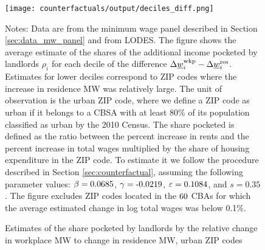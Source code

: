 \begin{figure}[h!]
    \centering
    \caption{Estimates of the share pocketed by landlords by the relative 
             change in workplace MW to change in residence MW, urban ZIP codes}
    \label{fig:rho_by_decile_MW_gap}

	\texttt{[image: counterfactuals/output/deciles\_diff.png]}

    \begin{minipage}{.95\textwidth} \footnotesize
        \vspace{3mm}
        Notes:
        Data are from the minimum wage panel described in 
        Section \ref{sec:data_mw_panel} and from LODES.
        The figure shows the average estimate of the shares of the additional 
        income pocketed by landlords $\rho_i$ for each decile of the 
        difference $\Delta \underline{w}_i^{\text{wkp}} - \Delta \underline{w}_i^{\text{res}}$.
        Estimates for lower deciles correspond to ZIP codes where the increase 
        in residence MW was relatively large.
        The unit of observation is the urban ZIP code, where we define a ZIP code 
        as urban if it belongs to a CBSA with at least 80\% of its population 
        classified as urban by the 2010 Census.
        The share pocketed is defined as the ratio between the percent increase 
        in rents and the percent increase in total wages multiplied by the share 
        of housing expenditure in the ZIP code.
        To estimate it we follow the procedure described in Section 
        \ref{sec:counterfactual}, assuming the following parameter values: 
        $\beta = \textnormal{0.0685}$, $\gamma = \textnormal{-0.0219}$, $\varepsilon = \textnormal{0.1084}$, and 
        $s = 0.35$.
        The figure excludes ZIP codes located in the $\textnormal{60}$ CBAs for which the average
        estimated change in log total wages was below 0.1\%.
    \end{minipage}
\end{figure}
